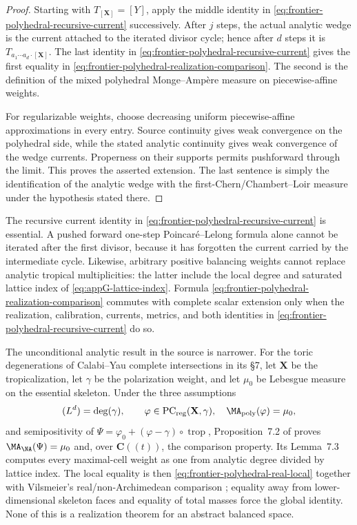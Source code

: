 \begin{proof}
Starting with \(T_{[\mathbf X]}=[Y]\), apply the middle identity in
\eqref{eq:frontier-polyhedral-recursive-current} successively.  After
\(j\) steps, the actual analytic wedge is the current attached to the
iterated divisor cycle; hence after \(d\) steps it is
\(T_{a_1\cdots a_d\cdot[\mathbf X]}\).  The last identity in
\eqref{eq:frontier-polyhedral-recursive-current} gives the first equality
in \eqref{eq:frontier-polyhedral-realization-comparison}.  The second is the
definition of the mixed polyhedral Monge--Amp\`ere measure on
piecewise-affine weights.

For regularizable weights, choose decreasing uniform piecewise-affine
approximations in every entry.  Source continuity gives weak convergence on
the polyhedral side, while the stated analytic continuity gives weak
convergence of the wedge currents.  Properness on their supports permits
pushforward through the limit.  This proves the asserted extension.  The
last sentence is simply the identification of the analytic wedge with the
first-Chern/Chambert--Loir measure under the hypothesis stated there.
\end{proof}

The recursive current identity in
\eqref{eq:frontier-polyhedral-recursive-current} is essential.  A pushed
forward one-step Poincar\'e--Lelong formula alone cannot be iterated after the
first divisor, because it has forgotten the current carried by the
intermediate cycle.  Likewise, arbitrary positive balancing weights cannot
replace analytic tropical multiplicities: the latter include the local
degree and saturated lattice index of
\eqref{eq:appG-lattice-index}.  Formula
\eqref{eq:frontier-polyhedral-realization-comparison} commutes with complete
scalar extension only when the realization, calibration, currents, metrics,
and both identities in
\eqref{eq:frontier-polyhedral-recursive-current} do so.

The unconditional analytic result in the source is narrower.  For the
toric degenerations of Calabi--Yau complete intersections in its
\S7, let \(\mathbf X\) be the tropicalization, let
\(\gamma\) be the polarization weight, and let \(\mu_0\) be Lebesgue
measure on the essential skeleton.  Under the three assumptions
\[
 (L^d)=\deg(\gamma),\qquad
 \varphi\in\mathrm{PC}_{\mathrm{reg}}(\mathbf X,\gamma),
 \quad\MA_{\mathrm{poly}}(\varphi)=\mu_0,
\]
and semipositivity of
\(
 \Psi=\varphi_0+(\varphi-\gamma)\circ\operatorname{trop}
\), Proposition~7.2 of \cite{BMPS26} proves
\(
 \MA_{\NA}(\Psi)=\mu_0
\)
and, over \(\mathbf C((t))\), the comparison property.  Its Lemma~7.3
computes every maximal-cell weight as one from analytic degree divided by
lattice index.  The local equality is then
\eqref{eq:frontier-polyhedral-real-local} together with Vilsmeier's
real/non-Archimedean comparison \cite[Theorem~1.1]{Vil20}; equality away
from lower-dimensional skeleton faces and equality of total masses force
the global identity.  None of this is a realization theorem for an abstract
balanced space.

